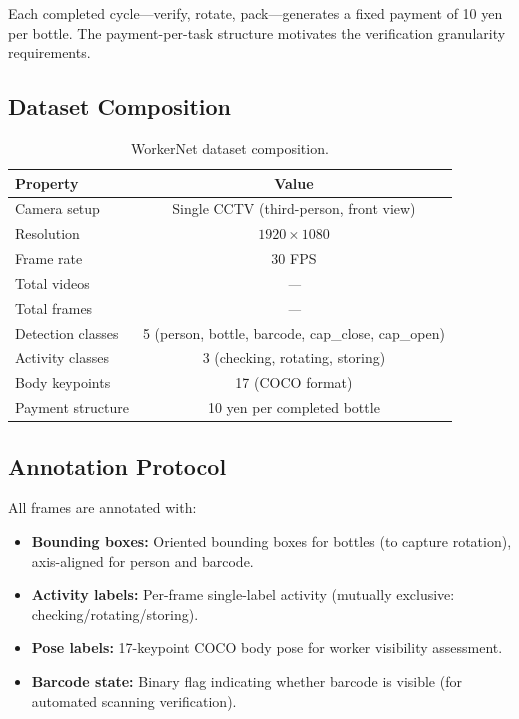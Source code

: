 \documentclass[10pt,twocolumn]{article}
\newcommand{\todo}{\textit{---}}
\newcommand{\popwres}{\todo}
\begin{document}
Each completed cycle---verify, rotate, pack---generates a fixed payment of 10 yen per bottle. The payment-per-task structure motivates the verification granularity requirements.

\subsection{Dataset Composition}

\begin{table}[htbp]
\centering
\small
\caption{WorkerNet dataset composition.}
\label{tab:workernet-composition}
\begin{tabular}{l c}
\toprule
\textbf{Property} & \textbf{Value} \\
\midrule
Camera setup & Single CCTV (third-person, front view) \\
Resolution & $1920 \times 1080$ \\
Frame rate & 30 FPS \\
Total videos & \popwres \\
Total frames & \popwres \\
Detection classes & 5 (person, bottle, barcode, cap\_close, cap\_open) \\
Activity classes & 3 (checking, rotating, storing) \\
Body keypoints & 17 (COCO format) \\
Payment structure & 10 yen per completed bottle \\
\bottomrule
\end{tabular}
\end{table}

\subsection{Annotation Protocol}

All frames are annotated with:
\begin{itemize}[nosep]
\item \textbf{Bounding boxes:} Oriented bounding boxes for bottles (to capture rotation), axis-aligned for person and barcode.
\item \textbf{Activity labels:} Per-frame single-label activity (mutually exclusive: checking/rotating/storing).
\item \textbf{Pose labels:} 17-keypoint COCO body pose for worker visibility assessment.
\item \textbf{Barcode state:} Binary flag indicating whether barcode is visible (for automated scanning verification).
\end{itemize}
\end{document}

